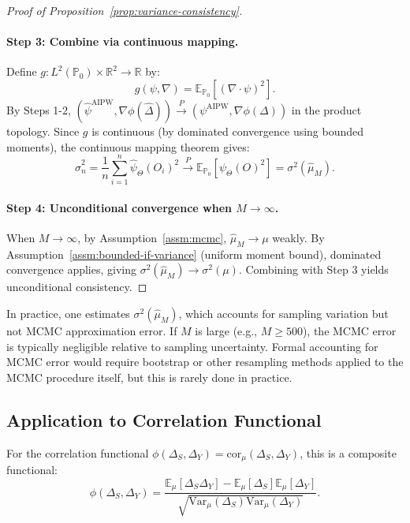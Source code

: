 \begin{proof}[Proof of Proposition~\ref{prop:variance-consistency}]
\paragraph{Step 3: Combine via continuous mapping.}
Define $g: L^2(\mathbb{P}_0) \times \mathbb{R}^2 \to \mathbb{R}$ by:
\begin{equation}
g(\psi, \nabla) = \mathbb{E}_{\mathbb{P}_0}[(\nabla \cdot \psi)^2].
\end{equation}
By Steps 1-2, $(\hat{\psi}^{\text{AIPW}}, \nabla\phi(\hat{\Delta})) \xrightarrow{P} (\psi^{\text{AIPW}}, \nabla\phi(\Delta))$ in the product topology. Since $g$ is continuous (by dominated convergence using bounded moments), the continuous mapping theorem gives:
\begin{equation}
\hat{\sigma}^2_n = \frac{1}{n}\sum_{i=1}^n \hat{\psi}_\Theta(O_i)^2 \xrightarrow{P} \mathbb{E}_{\mathbb{P}_0}[\psi_\Theta(O)^2] = \sigma^2(\hat{\mu}_M).
\end{equation}

\paragraph{Step 4: Unconditional convergence when $M \to \infty$.}
When $M \to \infty$, by Assumption~\ref{assm:mcmc}, $\hat{\mu}_M \to \mu$ weakly. By Assumption~\ref{assm:bounded-if-variance} (uniform moment bound), dominated convergence applies, giving $\sigma^2(\hat{\mu}_M) \to \sigma^2(\mu)$. Combining with Step 3 yields unconditional consistency.
\end{proof}

\begin{remark}
In practice, one estimates $\sigma^2(\hat{\mu}_M)$, which accounts for sampling variation but not MCMC approximation error. If $M$ is large (e.g., $M \geq 500$), the MCMC error is typically negligible relative to sampling uncertainty. Formal accounting for MCMC error would require bootstrap or other resampling methods applied to the MCMC procedure itself, but this is rarely done in practice.
\end{remark}

\subsection{Application to Correlation Functional}\label{sec:correlation-application}

For the correlation functional $\phi(\Delta_S, \Delta_Y) = \text{cor}_\mu(\Delta_S, \Delta_Y)$, this is a composite functional:
\begin{equation}
\phi(\Delta_S, \Delta_Y) = \frac{\mathbb{E}_\mu[\Delta_S \Delta_Y] - \mathbb{E}_\mu[\Delta_S]\mathbb{E}_\mu[\Delta_Y]}{\sqrt{\text{Var}_\mu(\Delta_S) \text{Var}_\mu(\Delta_Y)}}.
\end{equation}

